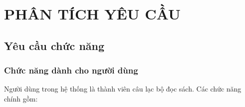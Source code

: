 
\section{PHÂN TÍCH YÊU CẦU}

\subsection{Yêu cầu chức năng}

\subsubsection{Chức năng dành cho người dùng}

Người dùng trong hệ thống là thành viên câu lạc bộ đọc sách. Các chức năng chính gồm:

